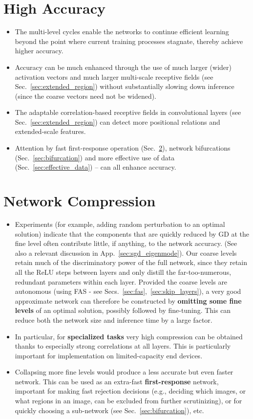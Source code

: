 \documentclass{article} %
\begin{document}
\section{High Accuracy}
\label{sec:high_accuracy}
\begin{itemize}
\item The multi-level cycles enable the networks to continue efficient learning beyond the point where current training processes stagnate, thereby achieve higher accuracy.
\item Accuracy can be much enhanced through the use of much larger (wider) activation vectors and much larger multi-scale receptive fields (see Sec.~\ref{sec:extended_region}) without substantially slowing down inference (since the coarse vectors need not be widened).
\item The adaptable correlation-based receptive fields in convolutional layers (see Sec.~\ref{sec:extended_region}) can detect more positional relations and extended-scale features.
  \item Attention by fast first-response operation (Sec.~\ref{sec:network_compression}), network bifurcations (Sec.~\ref{sec:bifurcation}) and more effective use of data (Sec.~\ref{sec:effective_data}) -- can all enhance accuracy.
\end{itemize}

\section{Network Compression}
\label{sec:network_compression}
\begin{itemize}
\item Experiments (for example, adding random perturbation to an optimal solution) indicate that the components that are quickly reduced by GD at the fine level often contribute little, if anything, to the network accuracy. (See also a relevant discussion in App.~\ref{sec:sgd_eigenmode}). Our coarse levels retain much of the discriminatory power of the full network, since they retain all the ReLU steps between layers and only distill the far-too-numerous, redundant parameters within each layer. Provided the coarse levels are autonomous (using FAS - see Secs.~\ref{sec:fas},~\ref{sec:skip_layers}), a very good approximate network can therefore be constructed by \textbf{omitting some fine levels} of an optimal solution, possibly followed by fine-tuning. This can reduce both the network size and inference time by a large factor.
\item In particular, for \textbf{specialized tasks} very high compression can be obtained thanks to especially strong correlations at all layers. This is particularly important for implementation on limited-capacity end devices.
\item Collapsing more fine levels would produce a less accurate but even faster network. This can be used as an extra-fast \textbf{first-response} network, important for making fast rejection decisions (e.g., deciding which images, or what regions in an image, can be excluded from further scrutinizing), or for quickly choosing a sub-network (see Sec.~\ref{sec:bifurcation}), etc.
\end{itemize}
\end{document}
